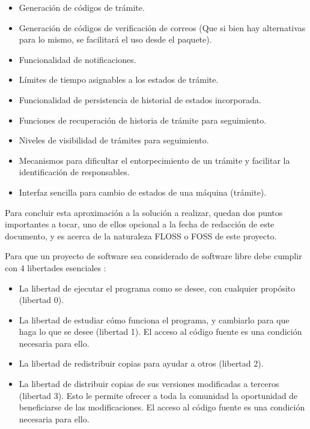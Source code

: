 \begin{itemize}
	\item Generación de códigos de trámite.

	\item Generación de códigos de verificación de correos (Que si bien hay
	      alternativas para lo mismo, se facilitará el uso desde el paquete).

	\item Funcionalidad de notificaciones.

	\item Límites de tiempo asignables a los estados de trámite.

	\item Funcionalidad de persistencia de historial de estados incorporada.

	\item Funciones de recuperación de historia de trámite para seguimiento.

	\item Niveles de visibilidad de trámites para seguimiento.

	\item Mecanismos para dificultar el entorpecimiento de un trámite y
	      facilitar la identificación de responsables.

	\item Interfaz sencilla para cambio de estados de una máquina (trámite).
\end{itemize}

Para concluir esta aproximación a la solución a realizar, quedan dos puntos
importantes a tocar, uno de ellos opcional a la fecha de redacción de este
documento, y es acerca de la naturaleza FLOSS o FOSS de este proyecto.

Para que un proyecto de software sea considerado de software libre debe cumplir
con 4 libertades esenciales \cite{QueEsSoftware}:

\begin{itemize}
	\item La libertad de ejecutar el programa como se desee, con cualquier
	      propósito (libertad 0).

	\item La libertad de estudiar cómo funciona el programa, y cambiarlo para
	      que haga lo que se desee (libertad 1). El acceso al código fuente es una
	      condición necesaria para ello.

	\item La libertad de redistribuir copias para ayudar a otros (libertad 2).

	\item La libertad de distribuir copias de sus versiones modificadas a
	      terceros (libertad 3). Esto le permite ofrecer a toda la comunidad la
	      oportunidad de beneficiarse de las modificaciones. El acceso al código
	      fuente es una condición necesaria para ello.
\end{itemize}

